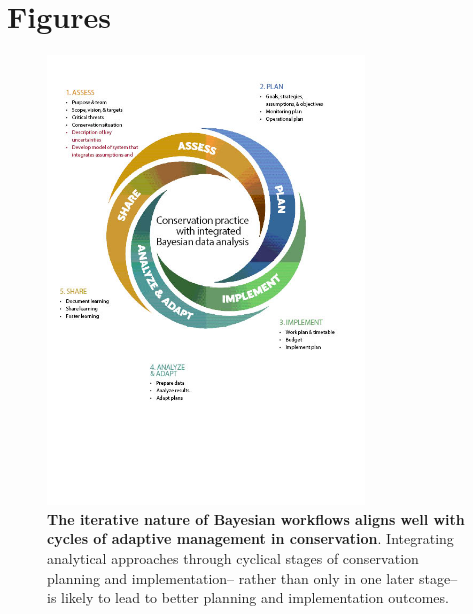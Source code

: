 \documentclass{article}
\begin{document}
\section* {Figures}
 \begin{figure}[h]
\centering
 
  \includegraphics[width=0.75\textwidth]{../figs/Cycles_wBayes2.jpg}
 \caption{\textbf{The iterative nature of Bayesian workflows aligns well with cycles of adaptive management in conservation}. Integrating analytical approaches through cyclical stages of conservation planning and implementation-- rather than only in one later stage-- is likely to lead to better planning and implementation outcomes.} 
 \label{fig:workflow}
 \end{figure}
\end{document}
